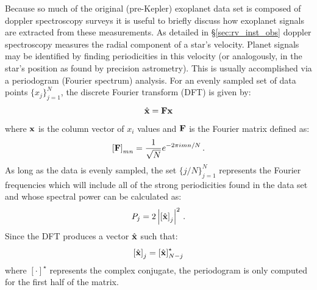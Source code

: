 Because so much of the original (pre-Kepler) exoplanet data set is composed of doppler spectroscopy surveys it is useful to briefly discuss how exoplanet signals are extracted from these measurements.  As detailed in \S\ref{sec:rv_inst_obs} doppler spectroscopy measures the  radial component of a star's velocity.  Planet signals may be identified by finding periodicities in this velocity (or analogously, in the star's position as found by precision astrometry).  This is usually accomplished via a periodogram (Fourier spectrum) analysis.  For an evenly sampled set of data points $\{x_j\}_{j=1}^N$, the discrete Fourier transform (DFT) is given by:
\begin{equation}
\hat{\mathbf x} = \mathbf F \mathbf x
\end{equation}
where $\mathbf x$ is the column vector of $x_i$ values and $\mathbf F$ is the Fourier matrix defined as:
\begin{equation}
\left[\mathbf F\right]_{mn} = \frac{1}{\sqrt{N}}e^{-2\pi i m n/N} \,.
\end{equation}
As long as the data is evenly sampled, the set $\{j/N\}_{j=1}^N$ represents the Fourier frequencies which will include all of the strong periodicities found in the data set and whose spectral power can be calculated as:
\begin{equation}
P_j = 2\left\vert \left[\hat{\mathbf x}\right]_j \right\vert^2 \,.
\end{equation}
Since the DFT produces a vector $\hat{\mathbf x}$ such that:
\begin{equation}
\left[\hat{\mathbf x}\right]_j = \left[\hat{\mathbf x}\right]_{N-j}^\star
\end{equation}
where $[\cdot]^\star$ represents the complex conjugate, the periodogram is only computed for the first half of the matrix.

